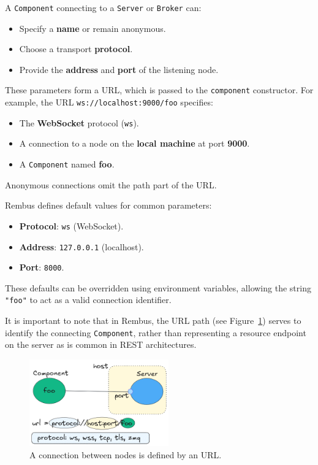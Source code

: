 \documentclass{juliacon}
\begin{document}
A \texttt{Component} connecting to a \texttt{Server} or \texttt{Broker}
can:

\begin{itemize}
\item
  Specify a \textbf{name} or remain anonymous.
\item
  Choose a transport \textbf{protocol}.
\item
  Provide the \textbf{address} and \textbf{port} of the listening node.
\end{itemize}

These parameters form a URL, which is passed to the \texttt{component}
constructor. For example, the URL \texttt{ws://localhost:9000/foo}
specifies:

\begin{itemize}
\item
  The \textbf{WebSocket} protocol (\texttt{ws}).
\item
  A connection to a node on the \textbf{local machine} at port
  \textbf{9000}.
\item
  A \texttt{Component} named \textbf{foo}.
\end{itemize}

Anonymous connections omit the path part of the URL.
\vskip 6pt

Rembus defines default values for common parameters:

\begin{itemize}
\item
  \textbf{Protocol}: \texttt{ws} (WebSocket).
\item
  \textbf{Address}: \texttt{127.0.0.1} (localhost).
\item
  \textbf{Port}: \texttt{8000}.
\end{itemize}

These defaults can be overridden using environment variables, allowing
the string \texttt{"foo"} to act as a valid connection identifier.
\vskip 6pt

It is important to note that in Rembus, the URL path (see Figure~\ref{fig:url})
serves to identify the connecting \texttt{Component}, rather than representing a
resource endpoint on the server as is common in REST architectures.

\begin{figure}[t]
  \centerline{\includegraphics[width=6cm]{figures/cid.png}}
  \caption{A connection between nodes is defined by an URL.}
  \label{fig:url}
\end{figure}
\end{document}
